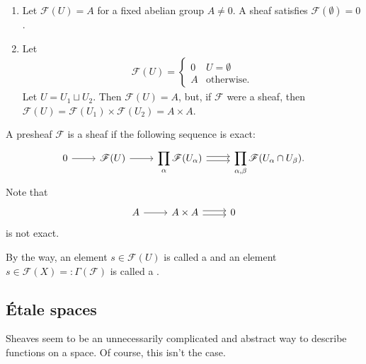 \documentclass [11 pt, oneside, margin = 1 in] {article}
\begin{document}
\begin{example}\label{}\text{}
\begin{enumerate}
	\item Let $\mathscr{F}(U) = A$ for a fixed abelian group $A\ne 0$. A sheaf satisfies $\mathscr{F}(\emptyset) = 0$.
	\item Let
		\begin{align*}
			\mathscr{F}(U) = 
			 \begin{cases}
				 0&U=\emptyset\\
				 A&\textrm{otherwise.}
			\end{cases}
		\end{align*}
		Let $U = U_1\sqcup U_2$. Then $\mathscr{F}(U) =A$, but, if $\mathscr{F}$ were a sheaf, then $\mathscr{F}(U) =  \mathscr{F}(U_1)\times \mathscr{F}(U_2) = A\times A$.
\end{enumerate}

A presheaf $\mathscr{F}$ is a sheaf if the following sequence is exact:
\[
\begin{tikzcd}
	0 \ar[r] & \mathscr{F}(U) \ar[r] & \displaystyle\prod_\alpha  \mathscr{F}(U_\alpha) \ar[r, yshift = 0.5 ex] \ar[r, yshift = -0.5 ex] & \displaystyle\prod_{\alpha,\beta}  \mathscr{F}(U_\alpha\cap U_\beta).
\end{tikzcd}
\]
Note that 
\[
\begin{tikzcd}
	A\ar[r] &A\times A \ar[r, yshift = 0.5 ex] \ar[r, yshift = -0.5 ex] & 0 
\end{tikzcd}
\]
is not exact.
\end{example}

By the way, an element $s\in \mathscr{F}(U)$ is called a  and an element $s\in \mathscr{F}(X)=: \Gamma(\mathscr{F})$ is called a .

\subsection{\'Etale spaces}
Sheaves seem to be an unnecessarily complicated and abstract way to describe functions on a space. Of course, this isn't the case.
\end{document}
